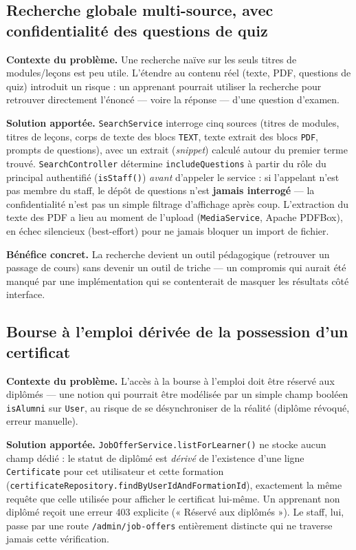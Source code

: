 \subsection{Recherche globale multi-source, avec confidentialité des questions de quiz}
\label{sec:recherche-globale}

\textbf{Contexte du problème.} Une recherche naïve sur les seuls titres de
modules/leçons est peu utile. L'étendre au contenu réel (texte, PDF,
questions de quiz) introduit un risque : un apprenant pourrait utiliser la
recherche pour retrouver directement l'énoncé --- voire la réponse --- d'une
question d'examen.

\textbf{Solution apportée.} \texttt{SearchService} interroge cinq sources
(titres de modules, titres de leçons, corps de texte des blocs \texttt{TEXT},
texte extrait des blocs \texttt{PDF}, prompts de questions), avec un
extrait (\emph{snippet}) calculé autour du premier terme trouvé.
\texttt{SearchController} détermine \texttt{includeQuestions} à partir du
rôle du principal authentifié (\texttt{isStaff()}) \emph{avant} d'appeler le
service : si l'appelant n'est pas membre du staff, le dépôt de questions
n'est \textbf{jamais interrogé} --- la confidentialité n'est pas un simple
filtrage d'affichage après coup. L'extraction du texte des PDF a lieu au
moment de l'upload (\texttt{MediaService}, Apache PDFBox), en échec
silencieux (best-effort) pour ne jamais bloquer un import de fichier.

\textbf{Bénéfice concret.} La recherche devient un outil pédagogique
(retrouver un passage de cours) sans devenir un outil de triche --- un
compromis qui aurait été manqué par une implémentation qui se contenterait
de masquer les résultats côté interface.

\subsection{Bourse à l'emploi dérivée de la possession d'un certificat}
\label{sec:bourse-emploi}

\textbf{Contexte du problème.} L'accès à la bourse à l'emploi doit être
réservé aux diplômés --- une notion qui pourrait être modélisée par un
simple champ booléen \texttt{isAlumni} sur \texttt{User}, au risque de se
désynchroniser de la réalité (diplôme révoqué, erreur manuelle).

\textbf{Solution apportée.} \texttt{JobOfferService.listForLearner()} ne
stocke aucun champ dédié : le statut de diplômé est \emph{dérivé} de
l'existence d'une ligne \texttt{Certificate} pour cet utilisateur et cette
formation (\texttt{certificateRepository.findByUserIdAndFormationId}),
exactement la même requête que celle utilisée pour afficher le certificat
lui-même. Un apprenant non diplômé reçoit une erreur 403 explicite
(« Réservé aux diplômés »). Le staff, lui, passe par une route
\texttt{/admin/job-offers} entièrement distincte qui ne traverse jamais
cette vérification.

